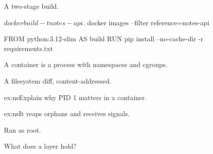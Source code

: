 \documentclass[11pt,oneside]{book}
\begin{document}
\begin{example}A two-stage build.\end{example}
\begin{shell}
$ docker build -t notes-api .
$ docker images --filter reference=notes-api
\end{shell}
\begin{codeblock}[language=Dockerfile]
FROM python:3.12-slim AS build
RUN pip install --no-cache-dir -r requirements.txt
\end{codeblock}
\chaptersummary
A container is a process with namespaces and cgroups.
\chaptervocab
\begin{vocablist}\item[Layer] A filesystem diff, content-addressed.\end{vocablist}
\chapterexercises
\begin{exercise}[3]{ex:ns}Explain why PID 1 matters in a container.\end{exercise}
\begin{solution}{ex:ns}It reaps orphans and receives signals.\end{solution}
\begin{mistakes}\item Ran as root.\end{mistakes}
\begin{recall}\item What does a layer hold?\end{recall}
\end{document}
